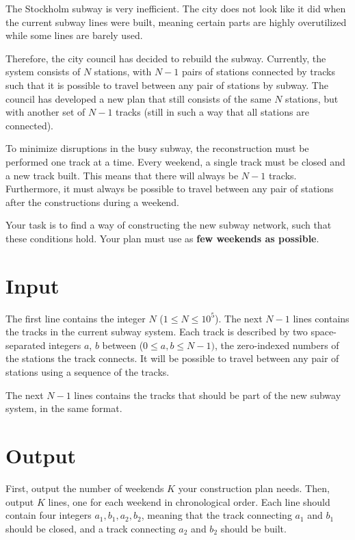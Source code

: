 \def\version{1}
The Stockholm subway is very inefficient.
The city does not look like it did when the current subway lines were built, meaning certain parts are highly overutilized while some lines are barely used.

Therefore, the city council has decided to rebuild the subway.
Currently, the system consists of $N$ stations, with $N - 1$ pairs of stations connected by tracks such that it is possible to travel between any pair of stations by subway.
The council has developed a new plan that still consists of the same $N$ stations, but with another set of $N - 1$ tracks (still in such a way that all stations are connected).

To minimize disruptions in the busy subway, the reconstruction must be performed one track at a time.
Every weekend, a single track must be closed and a new track built.
This means that there will always be $N - 1$ tracks.
Furthermore, it must always be possible to travel between any pair of stations after the constructions during a weekend.

Your task is to find a way of constructing the new subway network, such that these conditions hold.
Your plan must use as \textbf{few weekends as possible}.

\section*{Input}
The first line contains the integer $N$ ($1 \leq N \leq 10^5$).
The next $N - 1$ lines contains the tracks in the current subway system.
Each track is described by two space-separated integers $a$, $b$ between ($0 \leq a, b \leq N-1)$, the zero-indexed numbers of the stations the track connects.
It will be possible to travel between any pair of stations using a sequence of the tracks.

The next $N - 1$ lines contains the tracks that should be part of the new subway system, in the same format.

\section*{Output}
First, output the number of weekends $K$ your construction plan needs.
Then, output $K$ lines, one for each weekend in chronological order.
Each line should contain four integers $a_1, b_1, a_2, b_2$, meaning that the track connecting $a_1$ and $b_1$ should be closed, and a track connecting $a_2$ and $b_2$ should be built.

